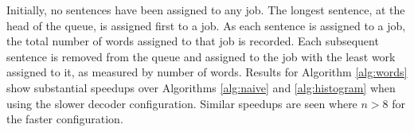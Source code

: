 \documentclass{pbml}
\begin{document}
%
Initially, no sentences have been assigned to any job.
%
The longest sentence, at the head of the queue, is assigned first to a job. As each sentence is assigned to a job, the total number of words assigned to that job is recorded. 
%
Each subsequent sentence is removed from the queue and assigned to the job with 
%
%
the least work assigned to it, as measured by number 
%
of words.
%
Results for Algorithm \ref{alg:words} show substantial speedups over Algorithms \ref{alg:naive} and \ref{alg:histogram} when using the slower decoder configuration. Similar speedups are seen where $n>8$ for the faster configuration.
\end{document}
